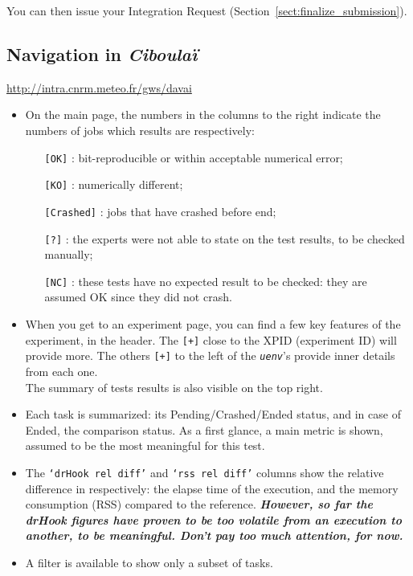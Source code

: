\documentclass[a4paper,10pt,twoside]{article}
\begin{document}
\noindent You can then issue your Integration Request (Section~\ref{sect:finalize_submission}).




\newpage
\subsection{Navigation in \textit{Ciboulaï}\label{sect:ciboulai_navigation}}
\href{http://intra.cnrm.meteo.fr/gws/davai}{http://intra.cnrm.meteo.fr/gws/davai}
\begin{itemize}
 \item On the main page, the numbers in the columns to the right indicate the numbers of jobs which results are respectively:
 \begin{itemize}
  \item[\texttt{[OK]}] : bit-reproducible or within acceptable numerical error;
  \item[\texttt{[KO]}] : numerically different;
  \item[\texttt{[Crashed]}] : jobs that have crashed before end;
  \item[\texttt{[?]}] : the experts were not able to state on the test results, to be checked manually;
  \item[\texttt{[NC]}] : these tests have no expected result to be checked: they are assumed OK since they did not crash.
 \end{itemize}
 \item When you get to an experiment page, you can find a few key features of the experiment, in the header. The \texttt{[+]} close to the XPID (experiment ID) will provide more. The others \texttt{[+]} to the left of the \textit{\texttt{uenv}}'s provide inner details from each one.\\
 The summary of tests results is also visible on the top right.
 \item Each task is summarized: its Pending/Crashed/Ended status, and in case of Ended, the comparison status. As a first glance, a main metric is shown, assumed to be the most meaningful for this test.
 \item The \texttt{`drHook rel diff'} and \texttt{`rss rel diff'} columns show the relative difference in respectively: the elapse time of the execution, and the memory consumption (RSS) compared to the reference. \textit{\textbf{However, so far the drHook figures have proven to be too volatile from an execution to another, to be meaningful. Don't pay too much attention, for now.}}
 \item A filter is available to show only a subset of tasks.

\end{itemize}
\end{document}

